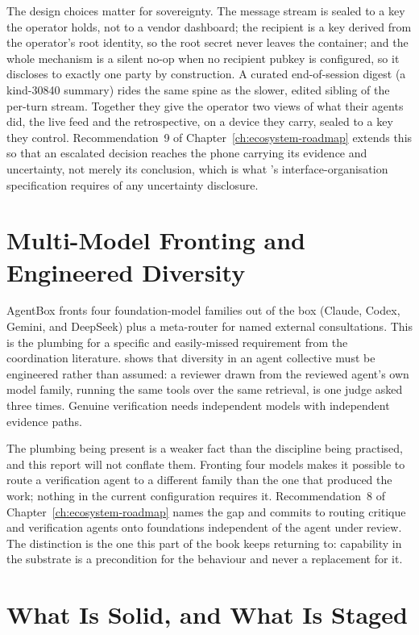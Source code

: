 The design choices matter for sovereignty. The message stream is sealed to a key the operator holds, not to a vendor dashboard; the recipient is a key derived
from the operator's root identity, so the root secret never leaves the container; and the whole mechanism is a silent no-op when no recipient pubkey is
configured, so it discloses to exactly one party by construction. A curated end-of-session digest (a kind-30840 summary) rides the same spine as the slower,
edited sibling of the per-turn stream. Together they give the operator two views of what their agents did, the live feed and the retrospective, on a device they
carry, sealed to a key they control. Recommendation~9 of Chapter~\ref{ch:ecosystem-roadmap} extends this so that an escalated decision reaches the phone
carrying its evidence and uncertainty, not merely its conclusion, which is what \textcite{Liu2026}'s interface-organisation specification requires of any
uncertainty disclosure.

\section{Multi-Model Fronting and Engineered Diversity}

AgentBox fronts four foundation-model families out of the box (Claude, Codex, Gemini, and DeepSeek) plus a meta-router for named external consultations. This is
the plumbing for a specific and easily-missed requirement from the coordination literature. \textcite{Liu2026} shows that diversity in an agent collective must
be engineered rather than assumed: a reviewer drawn from the reviewed agent's own model family, running the same tools over the same retrieval, is one judge
asked three times. Genuine verification needs independent models with independent evidence paths.

The plumbing being present is a weaker fact than the discipline being practised, and this report will not conflate them. Fronting four models makes it possible
to route a verification agent to a different family than the one that produced the work; nothing in the current configuration requires it. Recommendation~8 of
Chapter~\ref{ch:ecosystem-roadmap} names the gap and commits to routing critique and verification agents onto foundations independent of the agent under review.
The distinction is the one this part of the book keeps returning to: capability in the substrate is a precondition for the behaviour and never a replacement for
it.

\section{What Is Solid, and What Is Staged}

